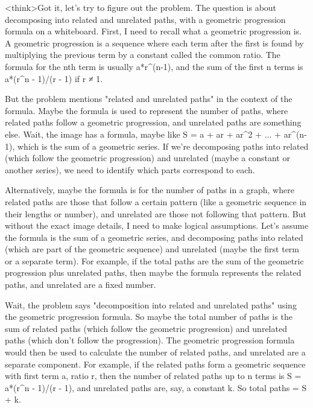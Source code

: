 <think>Got it, let's try to figure out the problem. The question is about decomposing into related and unrelated paths, with a geometric progression formula on a whiteboard. First, I need to recall what a geometric progression is. A geometric progression is a sequence where each term after the first is found by multiplying the previous term by a constant called the common ratio. The formula for the nth term is usually a*r^(n-1), and the sum of the first n terms is a*(r^n - 1)/(r - 1) if r ≠ 1.

But the problem mentions "related and unrelated paths" in the context of the formula. Maybe the formula is used to represent the number of paths, where related paths follow a geometric progression, and unrelated paths are something else. Wait, the image has a formula, maybe like S = a + ar + ar^2 + ... + ar^(n-1), which is the sum of a geometric series. If we're decomposing paths into related (which follow the geometric progression) and unrelated (maybe a constant or another series), we need to identify which parts correspond to each.

Alternatively, maybe the formula is for the number of paths in a graph, where related paths are those that follow a certain pattern (like a geometric sequence in their lengths or number), and unrelated are those not following that pattern. But without the exact image details, I need to make logical assumptions. Let's assume the formula is the sum of a geometric series, and decomposing paths into related (which are part of the geometric sequence) and unrelated (maybe the first term or a separate term). For example, if the total paths are the sum of the geometric progression plus unrelated paths, then maybe the formula represents the related paths, and unrelated are a fixed number.

Wait, the problem says "decomposition into related and unrelated paths" using the geometric progression formula. So maybe the total number of paths is the sum of related paths (which follow the geometric progression) and unrelated paths (which don't follow the progression). The geometric progression formula would then be used to calculate the number of related paths, and unrelated are a separate component. For example, if the related paths form a geometric sequence with first term a, ratio r, then the number of related paths up to n terms is S = a*(r^n - 1)/(r - 1), and unrelated paths are, say, a constant k. So total paths = S + k.


